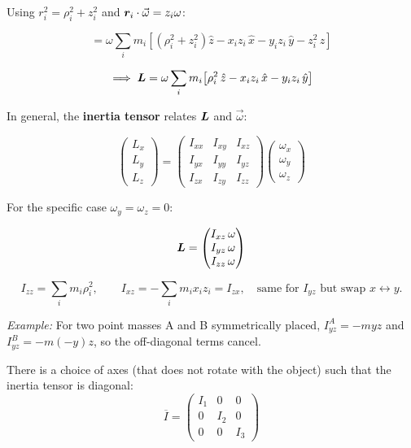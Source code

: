 Using $r_i^2 = \rho_i^2 + z_i^2$ and $\bm{r}_i\cdot\vec{\omega} = z_i\omega$:

\[
    = \omega\sum_i m_i\!\left[(\rho_i^2 + z_i^2)\hat{z} - x_i z_i\,\hat{x} - y_i z_i\,\hat{y} - z_i^2\,\hat{z}\right]
\]

\[
    \implies \vect{L} = \omega\sum_i m_i\!\left[\rho_i^2\,\hat{z} - x_i z_i\,\hat{x} - y_i z_i\,\hat{y}\right]
\]

In general, the \textbf{inertia tensor} relates $\vect{L}$ and $\vec{\omega}$:

\[
    \begin{pmatrix} L_x \\ L_y \\ L_z \end{pmatrix}
    =
    \begin{pmatrix} I_{xx} & I_{xy} & I_{xz} \\ I_{yx} & I_{yy} & I_{yz} \\ I_{zx} & I_{zy} & I_{zz} \end{pmatrix}
    \begin{pmatrix} \omega_x \\ \omega_y \\ \omega_z \end{pmatrix}
\]

For the specific case $\omega_y = \omega_z = 0$:

\[
    \vect{L} = \begin{pmatrix} I_{xz}\,\omega \\ I_{yz}\,\omega \\ I_{zz}\,\omega \end{pmatrix}
\]

\[
    I_{zz} = \sum_i m_i\rho_i^2,\qquad
    I_{xz} = -\sum_i m_i x_i z_i = I_{zx},
    \quad\text{same for }I_{yz}\text{ but swap }x\leftrightarrow y.
\]

\textit{Example:} For two point masses A and B symmetrically placed, $I_{yz}^A = -myz$ and $I_{yz}^B = -m(-y)z$, so the off-diagonal terms cancel.

\begin{theorem}
There is a choice of axes (that does not rotate with the object) such that the inertia tensor is diagonal:
\[
    \overline{I} = \begin{pmatrix} I_1 & 0 & 0 \\ 0 & I_2 & 0 \\ 0 & 0 & I_3 \end{pmatrix}
\]
\end{theorem}

